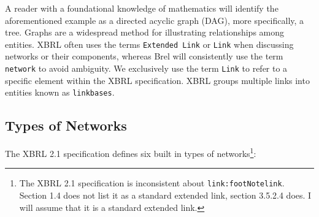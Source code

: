 
A reader with a foundational knowledge of mathematics will identify the aforementioned example as a directed acyclic graph (DAG), 
more specifically, a tree.
Graphs are a widespread method for illustrating relationships among entities.
XBRL often uses the terms \texttt{Extended Link} or \texttt{Link} when discussing networks or their components,
whereas Brel will consistently use the term \texttt{network} to avoid ambiguity.
We exclusively use the term \texttt{Link} to refer to a specific element within the XBRL specification.
XBRL groups multiple links into entities known as \texttt{linkbases}.

\subsection{Types of Networks}

The XBRL 2.1 specification defines six built in types of networks\cite{xbrl21_terminology}\footnote{The XBRL 2.1 specification is inconsistent about \texttt{link:footNotelink}. Section 1.4 does not list it as a standard extended link, section 3.5.2.4 does. I will assume that it is a standard extended link.}:

